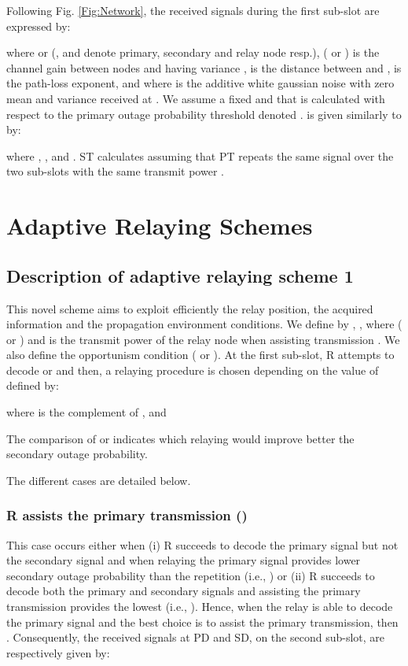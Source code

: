 \documentclass[conference,twocolumn]{IEEEtran}
\begin{document}
Following Fig. \ref{Fig:Network}, the received signals during the first sub-slot are expressed
by:

where  or  (,  and  denote primary, secondary
and relay node resp.),  ( or ) is the channel gain between nodes  and  having variance  ,  is the distance between  and ,  is the path-loss exponent, and where  is the
additive white gaussian noise with zero mean and variance
 received at . We assume a fixed  and that  is calculated with respect to the
primary outage probability threshold denoted .   is
given similarly to \cite{Zou} by:

where , ,  and . ST calculates  assuming that PT repeats the same signal over the two sub-slots with the same transmit power .

\section{Adaptive Relaying Schemes}

\subsection{Description of adaptive relaying scheme 1}


This novel scheme aims to exploit efficiently the relay position, the acquired information and the
propagation environment conditions. We define by , ,  where  ( or ) and  is the transmit power of the relay node when assisting transmission . We also define  the opportunism condition ( or ).
At the first sub-slot, R attempts to decode  or   and then, a relaying procedure is chosen depending on the value of  defined by:

where  is the complement of , and


The comparison of  or  indicates which relaying would improve better the secondary outage probability.

The different cases are detailed below.

\subsubsection{R assists the primary transmission ()}

This case occurs either when (i) R succeeds to decode the primary signal but not the secondary signal and when relaying the primary signal provides lower secondary outage probability than the repetition (i.e., ) or (ii) R succeeds to decode both the primary and secondary signals and assisting the primary transmission provides the lowest (i.e., ). Hence, when the relay is able to decode the primary signal and the best choice is to assist the primary transmission, then . Consequently, the received signals at PD and SD, on the second sub-slot, are respectively given by:
\end{document}
